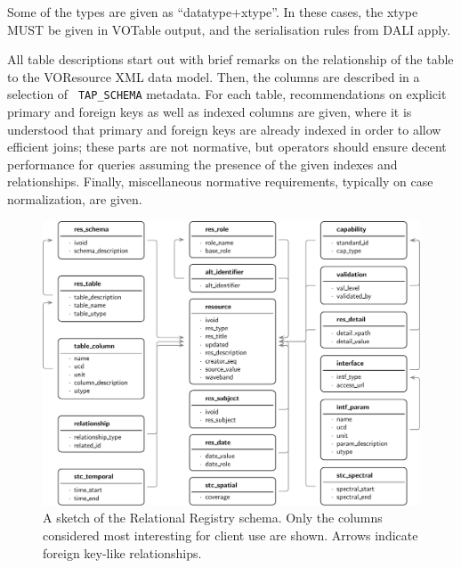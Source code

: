 \documentclass[11pt,a4paper]{ivoa}
\newcommand{\tapent}[1]{\texttt{\color{tapcolor} #1}}
\begin{document}
Some of the types are given as ``datatype+xtype''.  In these cases, the
xtype MUST be given in VOTable output, and the serialisation rules from
DALI \citep{2017ivoa.spec.0517D} apply.

All table descriptions start out with brief remarks on the
relationship of the table to the VOResource XML data model.  Then, the
columns are described in a selection of \tapent{TAP\_SCHEMA} metadata. For each
table, recommendations on explicit primary and foreign keys as well as
indexed columns are given, where it is understood that primary and
foreign keys are already indexed in order to allow efficient joins;
these parts are not normative, but operators should ensure decent
performance for queries assuming the presence of the given indexes and
relationships.  Finally, miscellaneous normative requirements, typically
on case normalization, are given.


\begin{figure}

\includegraphics[width=\textwidth]{schema.pdf}
\caption{A sketch of the
Relational Registry schema.
Only the columns considered
most interesting for client use are shown.  Arrows indicate foreign
key-like relationships.}
\end{figure}


\end{document}
